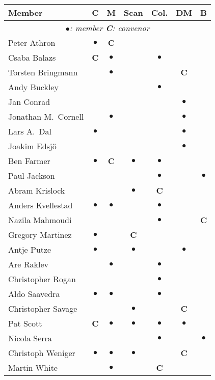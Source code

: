 \newcommand{\C}{\textbf{C}}            %
\newcommand{\M}{$\bullet$}             %
\newlength{\Mwidth} \settowidth{\Mwidth}{\M}
\newcommand{\E}{\makebox[\Mwidth]{}}   %
\begin{center}
\renewcommand{\arraystretch}{1.25}
\begin{tabular*}{0.99\textwidth}{@{\extracolsep{\fill}}|lcccccc|}
  \hline
  \textbf{Member} & \textbf{C}    & \textbf{M}   
                  & \textbf{Scan} & \textbf{Col.} 
                  & \textbf{DM}   & \textbf{B} \\
  \hline
  \multicolumn{7}{|c|}{\textit{\M{}: member \hspace{3em} \C{}: convenor}}\\
  Peter Athron          & \M&\C &    &    &    &    \\
  Csaba Balazs          & \C&\M &    & \M &    &    \\
  Torsten Bringmann     &   &\M &    &    & \C &    \\
  Andy Buckley          &   &   &    & \M &    &    \\
  Jan Conrad            &   &   &    &    & \M &    \\
  Jonathan M.\ Cornell  &   &\M &    &    & \M &    \\
  Lars A.\ Dal          & \M&   &    &    & \M &    \\
  Joakim Edsj\"o        &   &   &    &    & \M &    \\
  Ben Farmer            & \M&\C & \M & \M &    &    \\
  Paul Jackson          &   &   &    & \M &    & \M \\
  Abram Krislock        &   &   & \M & \C &    &    \\
  Anders Kvellestad     & \M&\M &    & \M &    &    \\
  Nazila Mahmoudi       &   &   &    & \M &    & \C \\
  Gregory Martinez      & \M&   & \C &    &    &    \\
  Antje Putze           & \M&   & \M &    & \M &    \\
  Are Raklev            &   &\M &    & \M &    &    \\
  Christopher Rogan     &   &   &    & \M &    &    \\
  Aldo Saavedra         & \M&\M &    & \M &    &    \\
  Christopher Savage    &   &   & \M &    & \C &    \\
  Pat Scott             & \C&\M & \M & \M & \M &    \\
  Nicola Serra          &   &   &    & \M &    & \M \\
  Christoph Weniger     & \M&\M & \M &    & \C &    \\
  Martin White          &   &\M &    & \C &    &    \\
  \hline
\end{tabular*}
\end{center}


